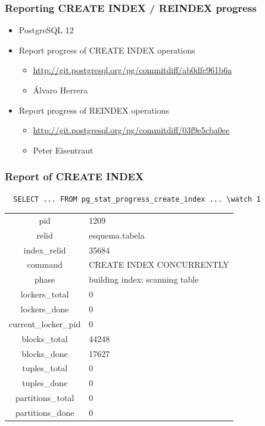 \documentclass[ignorenonframetext,t]{beamer}
\begin{document}
\begin{frame}
  \frametitle{Reporting CREATE INDEX / REINDEX progress}

  \begin{itemize}
    \item PostgreSQL 12
    \item Report progress of CREATE INDEX operations
      \begin{itemize}
	\item \url{http://git.postgresql.org/pg/commitdiff/ab0dfc961b6a}
	\item Álvaro Herrera
      \end{itemize}
    \item Report progress of REINDEX operations
      \begin{itemize}
	\item \url{http://git.postgresql.org/pg/commitdiff/03f9e5cba0ee}
	\item Peter Eisentraut
      \end{itemize}
  \end{itemize}
\end{frame}

\begin{frame}[fragile]
  \frametitle{Report of CREATE INDEX}

  \footnotesize
  \begin{verbatim}
  SELECT ... FROM pg_stat_progress_create_index ... \watch 1
  \end{verbatim}

\begin{tabular}{c|l}
\hline
pid & 1209 \\
relid & esquema.tabela \\
index\_relid & 35684 \\
command & CREATE INDEX CONCURRENTLY \\
phase & building index: scanning table \\
lockers\_total & 0 \\
lockers\_done & 0 \\
current\_locker\_pid & 0 \\
blocks\_total & 44248 \\
blocks\_done & 17627 \\
tuples\_total & 0 \\
tuples\_done & 0 \\
partitions\_total & 0 \\
partitions\_done & 0 \\
\end{tabular}

\end{frame}
\end{document}
